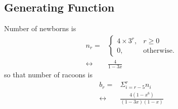 \documentclass{../../cls/sig-alternate-05-2015}
\begin{document}
\subsection{Generating Function}
Number of newborns is \begin{align}
	n_r = & \begin{cases}
		4 \times 3^r, & r \ge 0\\
		0, & \text{otherwise}.
	\end{cases}\\
	\leftrightarrow & \frac{4}{1 - 3x}
\end{align} so that number of racoons is \begin{align}
	b_r = & \Sigma_{i = r - 5}^{r} n_i\\
	\leftrightarrow & \frac{4(1 - x^6)}{(1 - 3x)(1 - x)}
\end{align}

\nocite{*}

 
\clearpage
\end{document}
